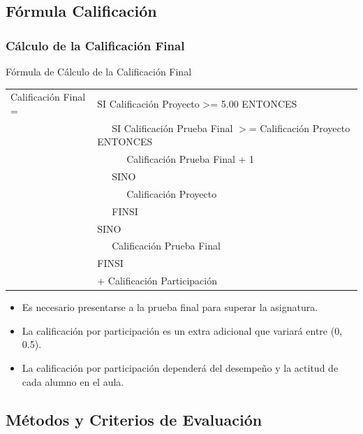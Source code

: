 \documentclass[a4paper,slidestop,xcolor=pst,dvips,blue]{beamer}
\begin{document}
\subsection{Fórmula Calificación}

\begin{frame}[c]
	\frametitle{Cálculo de la Calificación Final}
	\begin{block}{Fórmula de Cálculo de la Calificación Final}
		\begin{scriptsize}
        \begin{tabular}{ll}
			Calificación Final = & SI Calificación Proyecto >= 5.00 ENTONCES \\
                                 & \ \ \ SI Calificación Prueba Final  $>$= Calificación Proyecto ENTONCES \\
                                 & \ \ \ \ \ \ Calificación Prueba Final + 1  \\
                                 & \ \ \ SINO \\
                                 & \ \ \ \ \ \ Calificación Proyecto \\
                                 & \ \ \ FINSI \\
                                 & SINO \\
                                 & \ \ \  Calificación Prueba Final \\
                                 & FINSI \\
                                 & + Calificación Participación
		\end{tabular}
        \end{scriptsize}
	\end{block}
	\begin{itemize}
		\item<2-> Es necesario presentarse a la prueba final para superar la asignatura.
        \item<4-> La calificación por participación es un extra adicional que variará entre (0, 0.5).
        \item<5-> La calificación por participación dependerá del desempeño y la actitud de cada alumno en el aula.
	\end{itemize}
\end{frame}

\subsection{Métodos y Criterios de Evaluación}
\end{document}
